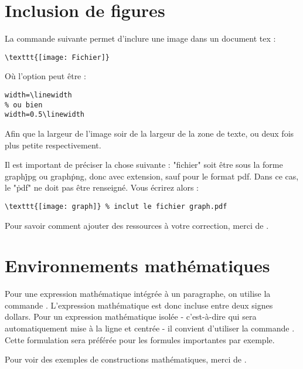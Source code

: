 \section{Inclusion de figures}
La commande suivante permet d'inclure une image dans un document tex :
\begin{verbatim}
\texttt{[image: Fichier]}
\end{verbatim}
Où l'option peut être :
\begin{verbatim}
width=\linewidth
% ou bien
width=0.5\linewidth
\end{verbatim}
Afin que la largeur de l'image soir de la largeur de la zone de texte, ou deux fois plus petite respectivement.

Il est important de préciser la chose suivante : "fichier" soit être sous la forme graph\.jpg ou graph\.png, donc avec extension, sauf pour le format pdf. Dans ce cas, le "\.pdf" ne doit pas être renseigné. Vous écrirez alors :
\begin{verbatim}
\texttt{[image: graph]} % inclut le fichier graph.pdf
\end{verbatim}

Pour savoir comment ajouter des ressources à votre correction, merci de .

\section{Environnements mathématiques}
Pour une expression mathématique intégrée à un paragraphe, on utilise la commande \texttt{}. L'expression mathématique est donc incluse entre deux signes dollars. Pour un expression mathématique isolée - c'est-à-dire qui sera automatiquement mise à la ligne et centrée - il convient d'utiliser la commande \texttt{}. Cette formulation sera préférée pour les formules importantes par exemple.

Pour voir des exemples de constructions mathématiques, merci de .